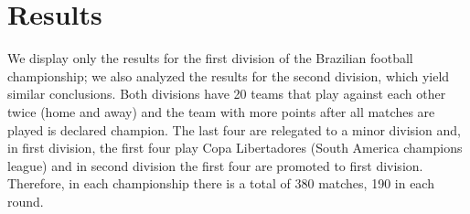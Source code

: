 \documentclass[journal,article,accept,moreauthors,pdftex,12pt,a4paper]{mdpi}
\begin{document}
	
	
	
	\section{Results}
	\label{sec::results}
	
	We display only the results for the first division of the Brazilian football championship; 
	we also analyzed the results for the second division, which yield similar conclusions.
	Both divisions have 20 teams that play against each other twice (home and away) and the team with more points after all matches are played is declared champion.
	The last four are relegated to a minor division and, in first division, the first four play Copa Libertadores (South America champions league) and in second division the first four are promoted to first division.
	Therefore, in each championship there is a total of 380 matches, 190 in each round.
	
	
	
\end{document}
